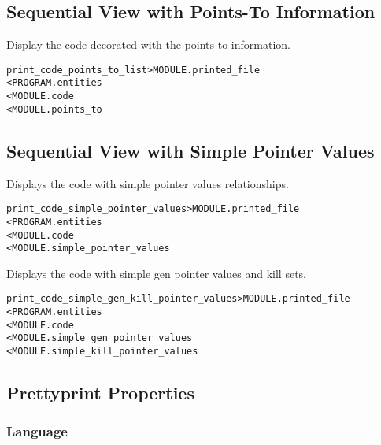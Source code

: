 \documentclass[a4paper]{report}
\newenvironment{PipsMake}{\begin{alltt}}{\end{alltt}}
\newenvironment{PipsPass}[1]{\label{pass:#1}}{}
\begin{document}
\subsection{Sequential View with Points-To  Information}

Display the code decorated with the points to information.

\begin{PipsMake}
print_code_points_to_list      > MODULE.printed_file
        < PROGRAM.entities
        < MODULE.code
        < MODULE.points_to
\end{PipsMake}

\subsection{Sequential View with Simple Pointer Values}

\begin{PipsPass}{print_code_simple_pointer_values}
Displays the code with simple pointer values relationships.
\end{PipsPass}

\begin{PipsMake}
print_code_simple_pointer_values      > MODULE.printed_file
        < PROGRAM.entities
        < MODULE.code
        < MODULE.simple_pointer_values
\end{PipsMake}

\begin{PipsPass}{print_code_genkill_pointer_values}
Displays the code with simple gen pointer values and kill sets.
\end{PipsPass}

\begin{PipsMake}
print_code_simple_gen_kill_pointer_values      > MODULE.printed_file
        < PROGRAM.entities
        < MODULE.code
        < MODULE.simple_gen_pointer_values
        < MODULE.simple_kill_pointer_values

\end{PipsMake}

\subsection{Prettyprint Properties}


\subsubsection{Language}
\end{document}

